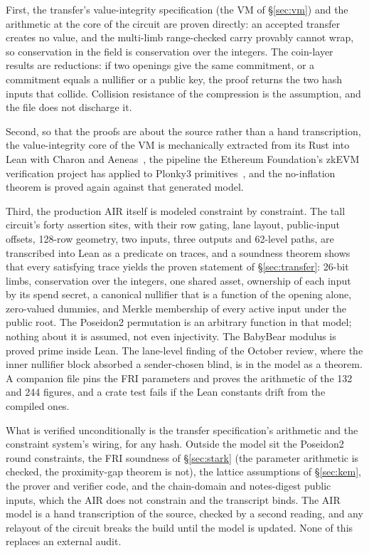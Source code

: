 \documentclass[twocolumn,10pt]{article}
\begin{document}
First, the transfer's value-integrity specification (the VM of \S\ref{sec:vm}) and the arithmetic at the core of the circuit are proven directly: an accepted transfer creates no value, and the multi-limb range-checked carry provably cannot wrap, so conservation in the field is conservation over the integers. The coin-layer results are reductions: if two openings give the same commitment, or a commitment equals a nullifier or a public key, the proof returns the two hash inputs that collide. Collision resistance of the compression is the assumption, and the file does not discharge it.

Second, so that the proofs are about the source rather than a hand transcription, the value-integrity core of the VM is mechanically extracted from its Rust into Lean with Charon and Aeneas~\cite{aeneas}, the pipeline the Ethereum Foundation's zkEVM verification project has applied to Plonky3 primitives~\cite{efpipeline}, and the no-inflation theorem is proved again against that generated model.

Third, the production AIR itself is modeled constraint by constraint. The tall circuit's forty assertion sites, with their row gating, lane layout, public-input offsets, 128-row geometry, two inputs, three outputs and 62-level paths, are transcribed into Lean as a predicate on traces, and a soundness theorem shows that every satisfying trace yields the proven statement of \S\ref{sec:transfer}: 26-bit limbs, conservation over the integers, one shared asset, ownership of each input by its spend secret, a canonical nullifier that is a function of the opening alone, zero-valued dummies, and Merkle membership of every active input under the public root. The Poseidon2 permutation is an arbitrary function in that model; nothing about it is assumed, not even injectivity. The BabyBear modulus is proved prime inside Lean. The lane-level finding of the October review, where the inner nullifier block absorbed a sender-chosen blind, is in the model as a theorem. A companion file pins the FRI parameters and proves the arithmetic of the 132 and 244 figures, and a crate test fails if the Lean constants drift from the compiled ones.

What is verified unconditionally is the transfer specification's arithmetic and the constraint system's wiring, for any hash. Outside the model sit the Poseidon2 round constraints, the FRI soundness of \S\ref{sec:stark} (the parameter arithmetic is checked, the proximity-gap theorem is not), the lattice assumptions of \S\ref{sec:kem}, the prover and verifier code, and the chain-domain and notes-digest public inputs, which the AIR does not constrain and the transcript binds. The AIR model is a hand transcription of the source, checked by a second reading, and any relayout of the circuit breaks the build until the model is updated. None of this replaces an external audit.
\end{document}

